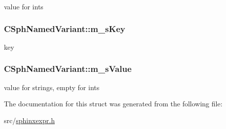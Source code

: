value for ints 

\hypertarget{structCSphNamedVariant_a6a23f15d2cfe18697b094669273ee3db}{
\subsubsection[{m\-\_\-s\-Key}]{ C\-Sph\-Named\-Variant\-::m\-\_\-s\-Key}}\label{structCSphNamedVariant_a6a23f15d2cfe18697b094669273ee3db}


key 

\hypertarget{structCSphNamedVariant_a44f68fd001613383ea1775dfcdb8f4c5}{
\subsubsection[{m\-\_\-s\-Value}]{ C\-Sph\-Named\-Variant\-::m\-\_\-s\-Value}}\label{structCSphNamedVariant_a44f68fd001613383ea1775dfcdb8f4c5}


value for strings, empty for ints 



The documentation for this struct was generated from the following file\-:\begin{DoxyCompactItemize}
\item 
src/\hyperlink{sphinxexpr_8h}{sphinxexpr.\-h}\end{DoxyCompactItemize}
